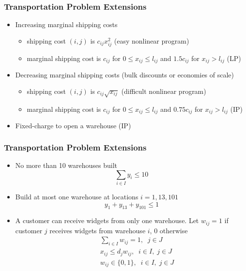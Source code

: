 \documentclass[12pt,handout]{beamer}
\begin{document}
\begin{frame}
\frametitle{Transportation Problem Extensions}
\begin{itemize}
\item Increasing marginal shipping costs
    \begin{itemize}
    \item shipping cost $(i,j)$ is $c_{ij} x_{ij}^2$ (easy nonlinear program)
    \item marginal shipping cost is $c_{ij}$ for $0 \le x_{ij} \le l_{ij}$ and $1.5c_{ij}$ for $x_{ij} > l_{ij}$ (LP)
    \end{itemize}
\item Decreasing marginal shipping costs (bulk discounts or economies of scale)
    \begin{itemize}
    \item shipping cost $(i,j)$ is $c_{ij} \sqrt{x_{ij}}$ (difficult nonlinear program)
    \item marginal shipping cost is $c_{ij}$ for $0 \le x_{ij} \le l_{ij}$ and $0.75c_{ij}$ for $x_{ij} > l_{ij}$ (IP)
    \end{itemize}
\item Fixed-charge to open a warehouse (IP)
\end{itemize}
\end{frame}


\begin{frame}
\frametitle{Transportation Problem Extensions}
\begin{itemize}
\item No more than 10 warehouses built
\begin{equation}
\sum_{i \in I} y_i \le 10 \nonumber
\end{equation}
\item Build at most one warehouse at locations $i = 1,13,101$
\begin{equation}
y_1 + y_{13} + y_{101} \le 1 \nonumber
\end{equation}
\item A customer can receive widgets from only one warehouse. Let $w_{ij} = 1$ if customer $j$ receives widgets from warehouse $i$, 0 otherwise
\begin{eqnarray}
&& \sum_{i \in I} w_{ij} = 1,\;\;j \in J \nonumber \\
&& x_{ij} \le d_j w_{ij},\;\;i \in I,\;j \in J \nonumber \\
&& w_{ij} \in \{0,1\},\;\;i \in I,\;j \in J \nonumber
\end{eqnarray}
\end{itemize}
\end{frame}
\end{document}
